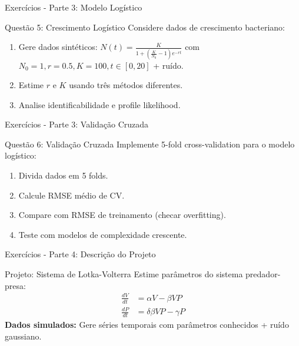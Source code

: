 \begin{frame}{Exercícios - Parte 3: Modelo Logístico}
\begin{alertblock}{Questão 5: Crescimento Logístico}
Considere dados de crescimento bacteriano:
\begin{enumerate}\small
    \item Gere dados sintéticos: $N(t) = \frac{K}{1 + \left(\frac{K}{N_0}-1\right)e^{-rt}}$ com $N_0=1, r=0.5, K=100, t \in [0, 20]$ + ruído.
    \item Estime $r$ e $K$ usando três métodos diferentes.
    \item Analise identificabilidade e profile likelihood.
\end{enumerate}
\end{alertblock}
\end{frame}

\begin{frame}{Exercícios - Parte 3: Validação Cruzada}
\begin{block}{Questão 6: Validação Cruzada}
Implemente 5-fold cross-validation para o modelo logístico:
\begin{enumerate}
    \item Divida dados em 5 folds.
    \item Calcule RMSE médio de CV.
    \item Compare com RMSE de treinamento (checar overfitting).
    \item Teste com modelos de complexidade crescente.
\end{enumerate}
\end{block}
\end{frame}

\begin{frame}{Exercícios - Parte 4: Descrição do Projeto}
\begin{alertblock}{Projeto: Sistema de Lotka-Volterra}
Estime parâmetros do sistema predador-presa:
\begin{align*}
\frac{dV}{dt} &= \alpha V - \beta V P\\
\frac{dP}{dt} &= \delta \beta V P - \gamma P
\end{align*}
\textbf{Dados simulados:} Gere séries temporais com parâmetros conhecidos + ruído gaussiano.
\end{alertblock}
\end{frame}

